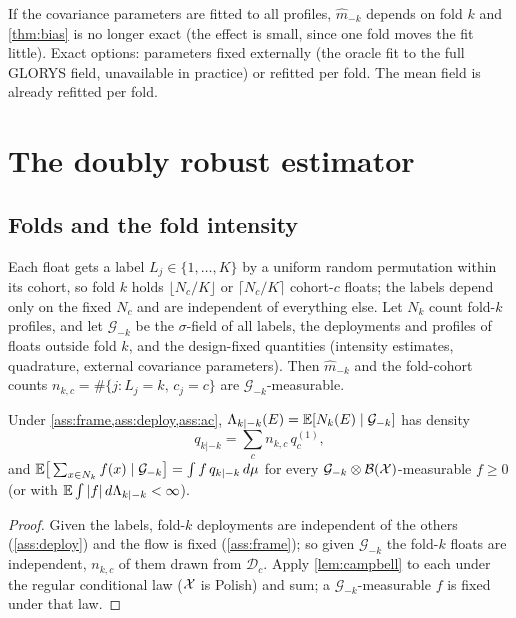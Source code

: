 \begin{remark}\label{rem:cov-params}
If the covariance parameters are fitted to all profiles, $\hat m_{-k}$ depends on fold $k$ and
\cref{thm:bias} is no longer exact (the effect is small, since one fold moves the fit little). Exact
options: parameters fixed externally (the oracle fit to the full GLORYS field, unavailable in
practice) or refitted per fold. The mean field is already refitted per fold.
\end{remark}

\section{The doubly robust estimator}\label{sec:dr}

\subsection{Folds and the fold intensity}

Each float gets a label $L_j\in\{1,\dots,K\}$ by a uniform random permutation within its cohort, so
fold $k$ holds $\lfloor N_c/K\rfloor$ or $\lceil N_c/K\rceil$ cohort-$c$ floats; the labels depend only on the
fixed $N_c$ and are independent of everything else.
Let $N_k$ count fold-$k$ profiles, and let $\mathcal G_{-k}$ be the $\sigma$-field of all labels, the
deployments and profiles of floats outside fold $k$, and the design-fixed quantities (intensity
estimates, quadrature, external covariance parameters). Then $\hat m_{-k}$ and the fold-cohort counts
$n_{k,c}=\#\{j:L_j=k,\,c_j=c\}$ are $\mathcal G_{-k}$-measurable.

\begin{lemma}\label{lem:fold-campbell}
Under \cref{ass:frame,ass:deploy,ass:ac}, $\Lambda_{k|-k}(E)=\mathbb{E}[N_k(E)\mid\mathcal G_{-k}]$ has density
\[
  q_{k|-k}=\sum_cn_{k,c}\,q^{(1)}_c ,
\]
and $\mathbb{E}\big[\sum_{x\in N_k}f(x)\mid\mathcal G_{-k}\big]=\int f\,q_{k|-k}\,d\mu$ for every
$\mathcal G_{-k}\otimes\mathcal{B}(\mathcal{X})$-measurable $f\ge0$ (or with $\mathbb{E}\int|f|\,d\Lambda_{k|-k}<\infty$).
\end{lemma}

\begin{proof}
Given the labels, fold-$k$ deployments are independent of the others (\cref{ass:deploy}) and the flow
is fixed (\cref{ass:frame}); so given $\mathcal G_{-k}$ the fold-$k$ floats are independent, $n_{k,c}$
of them drawn from $\mathcal D_c$. Apply \cref{lem:campbell} to each under the regular conditional law
($\mathcal{X}$ is Polish) and sum; a $\mathcal G_{-k}$-measurable $f$ is fixed under that law.
\end{proof}

